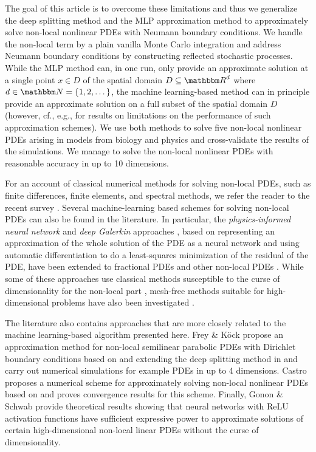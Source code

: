 The goal of this article is to overcome these limitations and thus we generalize the deep splitting method and the MLP approximation method to approximately solve non-local nonlinear PDEs with Neumann boundary conditions. We handle the non-local term by a plain vanilla Monte Carlo integration and address Neumann boundary conditions by constructing reflected stochastic processes. While the MLP method can, in one run, only provide an approximate solution at a single point $x \in D$ of the spatial domain $D\subseteq\R^d$ where $d\in\N=\{1,2,\dots\}$, the machine learning-based method can in principle provide an approximate solution on a full subset of the spatial domain $D$ (however, cf., e.g., \cite{heinrich1998monte,heinrich1999monte,grohs2021proof} for results on limitations on the performance of such approximation schemes).
%
We use both methods to solve five non-local nonlinear PDEs arising in models from biology and physics and cross-validate the results of the simulations.
%
We manage to solve the non-local nonlinear PDEs with reasonable accuracy in up to 10 dimensions.

For an account of classical numerical methods for solving non-local PDEs, such as finite differences, finite elements, and spectral methods, we refer the reader to the recent survey \cite{delia2020numerical}. Several machine-learning based schemes for solving non-local PDEs can also be found in the literature. 
%
In particular, the \emph{physics-informed neural network} and \emph{deep Galerkin} approaches \cite{raissi2019physics,Sirignano2018dgm}, based on representing an approximation of the whole solution of the PDE as a neural network and using automatic differentiation to do a least-squares minimization of the residual of the PDE, have been extended to fractional PDEs and other non-local PDEs \cite{pang2019fpinns,lu2021deepxde,guo2022monte,alaradi2019extensions,yuan2022apinn}. While some of these approaches use classical methods susceptible to the curse of dimensionality for the non-local part \cite{pang2019fpinns,lu2021deepxde}, mesh-free methods suitable for high-dimensional problems have also been investigated \cite{guo2022monte,alaradi2019extensions,yuan2022apinn}. 

The literature also contains approaches that are more closely related to the machine learning-based algorithm presented here. Frey \& K\"ock \cite{frey2021deep,frey2022deep} propose an approximation method for non-local semilinear parabolic PDEs with Dirichlet boundary conditions based on and extending the deep splitting method in \cite{Beck2019} and carry out numerical simulations for example PDEs in up to 4 dimensions. Castro \cite{castro2021deep} proposes a numerical scheme for approximately solving non-local nonlinear PDEs based on \cite{hure2020deep} and proves convergence results for this scheme.
%
Finally, Gonon \& Schwab \cite{gonon2021deep} provide theoretical results showing that neural networks with ReLU activation functions have sufficient expressive power to approximate solutions of certain high-dimensional non-local linear PDEs without the curse of dimensionality.

